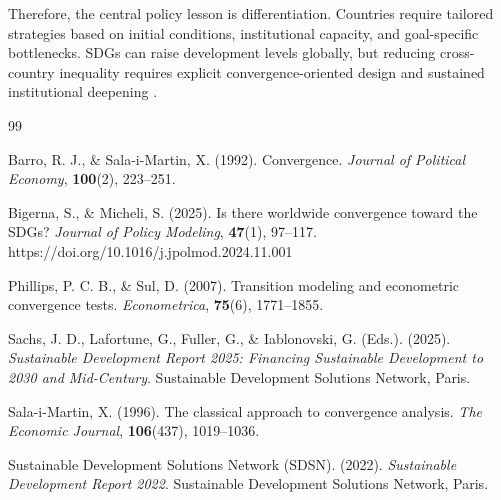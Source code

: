 Therefore, the central policy lesson is differentiation. Countries require tailored strategies based on initial conditions, institutional capacity, and goal-specific bottlenecks. SDGs can raise development levels globally, but reducing cross-country inequality requires explicit convergence-oriented design and sustained institutional deepening \citep{sachs2025,bigerna2025,phillips2007}.

\clearpage
\pagestyle{plain}
\hypersetup{linkcolor=blue}
\renewcommand{\bibname}{References}

\begin{thebibliography}{99}

Barro, R. J., \& Sala-i-Martin, X. (1992).
\newblock Convergence.
\newblock \emph{Journal of Political Economy}, \textbf{100}(2), 223--251.

Bigerna, S., \& Micheli, S. (2025).
\newblock Is there worldwide convergence toward the SDGs?
\newblock \emph{Journal of Policy Modeling}, \textbf{47}(1), 97--117.
\newblock https://doi.org/10.1016/j.jpolmod.2024.11.001

Phillips, P. C. B., \& Sul, D. (2007).
\newblock Transition modeling and econometric convergence tests.
\newblock \emph{Econometrica}, \textbf{75}(6), 1771--1855.

Sachs, J. D., Lafortune, G., Fuller, G., \& Iablonovski, G. (Eds.). (2025).
\newblock \emph{Sustainable Development Report 2025: Financing Sustainable
  Development to 2030 and Mid-Century}.
\newblock Sustainable Development Solutions Network, Paris.

Sala-i-Martin, X. (1996).
\newblock The classical approach to convergence analysis.
\newblock \emph{The Economic Journal}, \textbf{106}(437), 1019--1036.

Sustainable Development Solutions Network (SDSN). (2022).
\newblock \emph{Sustainable Development Report 2022}.
\newblock Sustainable Development Solutions Network, Paris.

\end{thebibliography}

\clearpage
